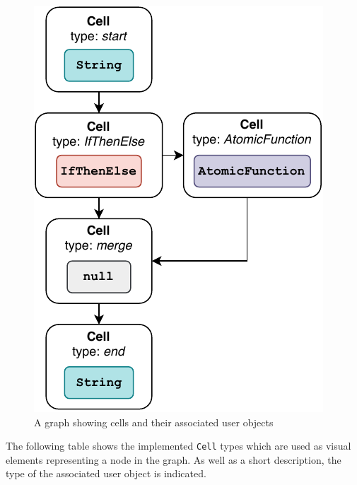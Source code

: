 \documentclass[a4paper,top=25mm,bottom=25mm,12pt,pdftex,halfparskip,twoside,bibtotoc,numbers=noenddot]{scrbook}
\begin{document}
\begin{figure}[H]
  \centering
  \vspace{0.5cm}
  \includegraphics[]{cell-user-objects}
  \caption{A graph showing cells and their associated user objects}
\end{figure}

\newpage

The following table shows the implemented \texttt{Cell} types which are used as visual elements representing a node in the graph. As well as a short description, the type of the associated user object is indicated.
\end{document}
